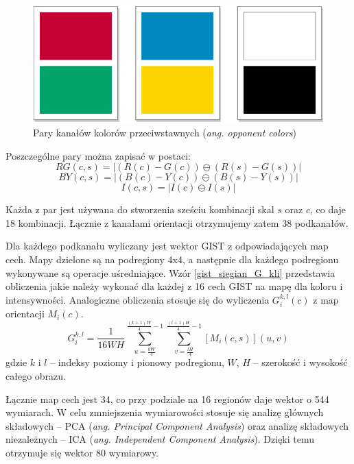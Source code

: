\begin{figure}[h]
	\centering
	\includegraphics[scale=1.0]{graphics/01_podstawy_teoretyczne/gist-opponent-colors.pdf}
	\caption{ Pary kanałów kolorów przeciwstawnych (\emph{ang. opponent colors}) }
	\label{fig:gist-opponent-colors}
\end{figure}

Poszczególne pary można zapisać w postaci:
\begin{equation} 
\label{gist_siegian_RG} 
RG(c,s) = |(R(c) - G(c)) \ominus (R(s) - G(s))|
\end{equation}
\begin{equation} 
\label{gist_siegian_BY} 
BY(c, s) = |(B(c) - Y(c)) \ominus (B(s) - Y(s))|
\end{equation}
\begin{equation} 
\label{gist_siegian_I} 
I(c, s) = |I(c) \ominus I(s)|
\end{equation}

Każda z par jest używana do stworzenia sześciu kombinacji skal $s$ oraz $c$, co daje 18 kombinacji. Łącznie z kanałami orientacji otrzymujemy zatem 38 podkanałów.

Dla każdego podkanału wyliczany jest wektor GIST z odpowiadających map cech. Mapy dzielone są na podregiony 4x4, a następnie dla każdego podregionu wykonywane są operacje uśredniające. Wzór \ref{gist_siegian_G_kli} przedstawia obliczenia jakie należy wykonać dla każdej z 16 cech GIST na mapę dla koloru i intensywności. Analogiczne obliczenia stosuje się do wyliczenia $G_i^{k,l}(c)$ z map orientacji $M_i(c)$.
\begin{equation} 
\label{gist_siegian_G_kli} 
G_i^{k,l} = \frac{1}{16WH} \sum\limits_{u = \frac{kW}{4}}^{\frac{(k+1)W}{4} - 1} \sum\limits_{v = \frac{lH}{4}}^{\frac{(l+1)H}{4} - 1} [M_i(c, s)](u, v)
\end{equation} gdzie $k$ i $l$ -- indeksy poziomy i pionowy podregionu, $W$, $H$ -- szerokość i wysokość całego obrazu.

Łącznie map cech jest 34, co przy podziale na 16 regionów daje wektor o 544 wymiarach. W celu zmniejszenia wymiarowości stosuje się analizę głównych składowych -- PCA (\emph{ang. Principal Component Analysis}) oraz analizę składowych niezależnych -- ICA (\emph{ang. Independent Component Analysis}). Dzięki temu otrzymuje się wektor 80 wymiarowy.

